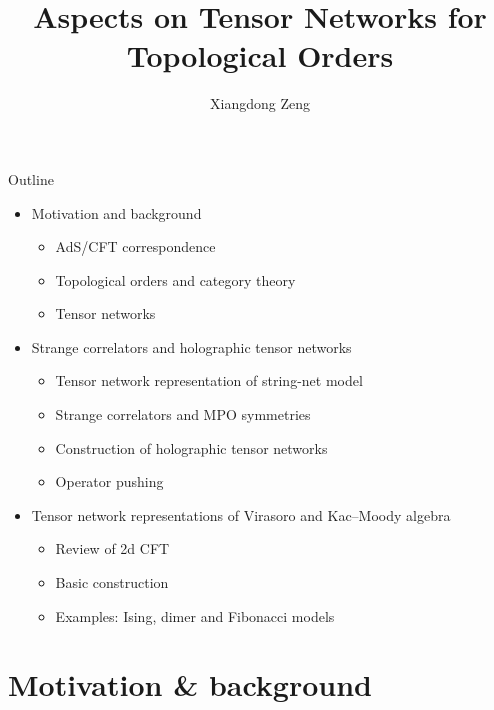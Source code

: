 \documentclass{fdubeamer}
\title{Aspects on Tensor Networks for Topological Orders}
\author{Xiangdong Zeng}
\institute{Supervisor: Prof.\ Ling-Yan Hung}
\newcommand{\1}{\mathbb{1}}
\begin{document}
\maketitle

\begin{frame}{Outline}

\begin{itemize}
  \item Motivation and background

    \begin{itemize}
      \item AdS/CFT correspondence
      \item Topological orders and category theory
      \item Tensor networks
    \end{itemize}

  \item Strange correlators and holographic tensor networks

    \begin{itemize}
      \item Tensor network representation of string-net model
      \item Strange correlators and MPO symmetries
      \item Construction of holographic tensor networks
      \item Operator pushing
    \end{itemize}

  \item Tensor network representations of Virasoro and Kac--Moody algebra

    \begin{itemize}
      \item Review of 2d CFT
      \item Basic construction
      \item Examples: Ising, dimer and Fibonacci models
    \end{itemize}
\end{itemize}

\end{frame}

\section{Motivation \& background}
\end{document}
